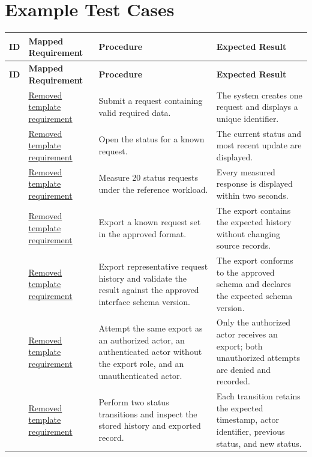 \section{Example Test Cases}
\begin{tabularx}{\linewidth}{L{2.1cm}L{3.0cm}YL{5.0cm}}
\caption{Template reference only: Test Case Examples\label{Table:TestCaseExamples}}\\
\toprule
\textbf{ID} & \textbf{Mapped Requirement} & \textbf{Procedure} & \textbf{Expected Result}\\
\midrule
\endfirsthead
\toprule
\textbf{ID} & \textbf{Mapped Requirement} & \textbf{Procedure} & \textbf{Expected Result}\\
\midrule
\endhead
{} & \hyperref[Section:RetiredTemplateRequirements]{Removed template requirement} & Submit a request containing valid required data. & The system creates one request and displays a unique identifier.\\
 & \hyperref[Section:RetiredTemplateRequirements]{Removed template requirement} & Open the status for a known request. & The current status and most recent update are displayed.\\
 & \hyperref[Section:RetiredTemplateRequirements]{Removed template requirement} & Measure 20 status requests under the reference workload. & Every measured response is displayed within two seconds.\\
 & \hyperref[Section:RetiredTemplateRequirements]{Removed template requirement} & Export a known request set in the approved format. & The export contains the expected history without changing source records.\\
 & \hyperref[Section:RetiredTemplateRequirements]{Removed template requirement} & Export representative request history and validate the result against the approved interface schema version. & The export conforms to the approved schema and declares the expected schema version.\\
 & \hyperref[Section:RetiredTemplateRequirements]{Removed template requirement} & Attempt the same export as an authorized actor, an authenticated actor without the export role, and an unauthenticated actor. & Only the authorized actor receives an export; both unauthorized attempts are denied and recorded.\\
 & \hyperref[Section:RetiredTemplateRequirements]{Removed template requirement} & Perform two status transitions and inspect the stored history and exported record. & Each transition retains the expected timestamp, actor identifier, previous status, and new status.\\

\end{tabularx}
